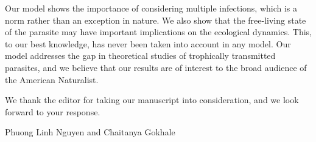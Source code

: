 Our model shows the importance of considering multiple infections, which is a norm rather than an exception in nature. 
We also show that the free-living state of the parasite may have important implications on the ecological dynamics.
This, to our best knowledge, has never been taken into account in any model. 
Our model addresses the gap in theoretical studies of trophically transmitted parasites,
and we believe that our results are of interest to the broad audience of the American Naturalist.

We thank the editor for taking our manuscript into consideration, and we look forward to your response.

Phuong Linh Nguyen and Chaitanya Gokhale

